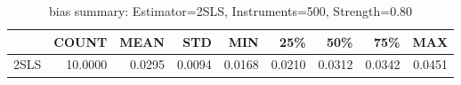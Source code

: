 \begin{table}[ht]
\centering
\caption{bias summary: Estimator=2SLS, Instruments=500, Strength=0.80}
\begin{tabular}{lrrrrrrrr}
\toprule
 & COUNT & MEAN & STD & MIN & 25\% & 50\% & 75\% & MAX \\
\midrule
2SLS & 10.0000 & 0.0295 & 0.0094 & 0.0168 & 0.0210 & 0.0312 & 0.0342 & 0.0451 \\
\bottomrule
\end{tabular}
\end{table}
